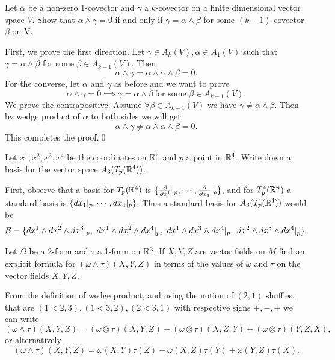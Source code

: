 \begin{problem}
	Let $ \alpha $ be a non-zero 1-covector and $ \gamma $ a $ k $-covector on a finite dimensional vector space $ V $. Show that $ \alpha \wedge \gamma = 0 $ if and only if $ \gamma = \alpha \wedge \beta $ for some $ (k-1) $-covector $ \beta $ on V.
\end{problem}
\begin{solution}
	First, we prove the first direction. Let $ \gamma \in A_k(V), \alpha \in A_1(V) $ such that $ \gamma = \alpha \wedge \beta  $ for some $ \beta \in A_{k-1}(V) $. Then
	\[ \alpha \wedge \gamma = \alpha \wedge \alpha \wedge \beta = 0. \]
	For the converse, let $ \alpha$ and $ \gamma $ as before and we want to prove
	\[ \alpha \wedge \gamma = 0 \implies \gamma = \alpha \wedge \beta\ \text{for some $\beta \in A_{k-1}(V)$}. \]
	We prove the contrapositive. Assume $ \forall \beta \in A_{k-1}(V) $ we have $ \gamma \neq \alpha \wedge \beta $. Then by wedge product of $ \alpha $ to both sides we will get
	\[ \alpha \wedge \gamma \neq \alpha\wedge\alpha\wedge\beta = 0. \]
	This completes the proof.\qed
\end{solution}


\begin{problem}
	Let $ x^1,x^2,x^3,x^4 $ be the coordinates on $ \mathbb{R}^4 $ and $ p $ a point in $ \mathbb{R}^4 $. Write down a basis for the vector space $ A_3(T_p(\mathbb{R}^4)) $.
\end{problem}
\begin{solution}
	First, observe that a basis for $ T_p(\mathbb{R}^4) $ is $ \{\frac{\partial}{\partial x^1}|_p,\cdots,\frac{\partial}{\partial x_4}|_p\} $, and for $ T_p^*(\mathbb{R}^n) $ a standard basis is $ \{dx_1|_p,\cdots,dx_4 |_p\} $. Thus a standard basis for $ A_3(T_p(\mathbb{R}^4)) $ would be
	\[ \mathcal{B} = \{dx^1\wedge dx^2\wedge dx^3|_p,\ dx^1\wedge dx^2\wedge dx^4|_p,\ dx^1\wedge dx^3\wedge dx^4|_p,\ dx^2\wedge dx^3 \wedge dx^4|_p \}. \]
\end{solution}

\begin{problem}
	Let $ \Omega $ be a 2-form and $ \tau $ a 1-form on $ \mathbb{R}^3 $. If $ X,Y,Z $ are vector fields on $ M $ find an explicit formula for $ (\omega \wedge \tau)(X,Y,Z) $ in terms of the values of $ \omega $ and $ \tau $ on the vector fields $ X,Y,Z $.
\end{problem}

\begin{solution}
	From the definition of wedge product, and using the notion of $ (2,1) $ shuffles, that are $ (1<2,3), (1<3,2), (2<3,1) $ with respective signs $ +,-,+ $ we can write
	\[ (\omega \wedge \tau) (X,Y,Z) = (\omega\otimes\tau)(X,Y,Z) -   (\omega\otimes\tau)(X,Z,Y) +  (\omega\otimes\tau)(Y,Z,X),   \]
	or alternatively
	\[ (\omega \wedge \tau) (X,Y,Z) = \omega(X,Y)\tau(Z) - \omega(X,Z)\tau(Y) + \omega(Y,Z)\tau(X). \]
\end{solution}

